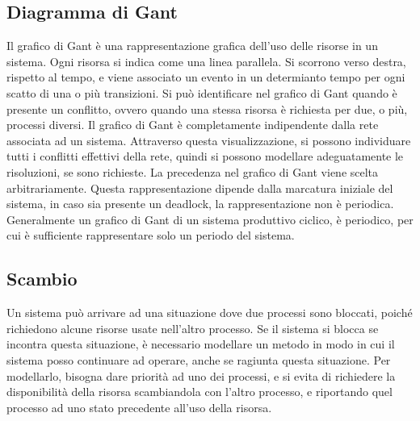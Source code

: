 \documentclass{article}
\numberwithin{equation}{subsection}
\begin{document}
\subsection{Diagramma di Gant}

Il grafico di Gant è una rappresentazione grafica dell'uso delle risorse in un sistema. Ogni risorsa si indica come una linea parallela. Si scorrono verso destra, rispetto 
al tempo, e viene associato un evento in un determianto tempo per ogni scatto di una o più transizioni. Si può identificare nel grafico di Gant quando è presente un conflitto, 
ovvero quando una stessa risorsa è richiesta per due, o più, processi diversi. Il grafico di Gant è completamente indipendente dalla rete associata ad un sistema. Attraverso 
questa visualizzazione, si possono individuare tutti i conflitti effettivi della rete, quindi si possono modellare adeguatamente le risoluzioni, se sono richieste. La 
precedenza nel grafico di Gant viene scelta arbitrariamente. Questa 
rappresentazione dipende dalla marcatura iniziale del sistema, in caso sia presente un deadlock, la rappresentazione non è periodica. Generalmente un grafico di Gant di un 
sistema produttivo ciclico, è periodico, per cui è sufficiente rappresentare solo un periodo del sistema. 

\subsection{Scambio}

Un sistema può arrivare ad una situazione dove due processi sono bloccati, poiché richiedono alcune risorse usate nell'altro processo. Se il sistema si blocca se incontra 
questa situazione, è necessario modellare un metodo in modo in cui il sistema posso continuare ad operare, anche se ragiunta questa situazione. Per modellarlo, bisogna 
dare priorità ad uno dei processi, e si evita di richiedere la disponibilità della risorsa scambiandola con l'altro processo, e riportando quel processo ad uno stato 
precedente all'uso della risorsa. 
\end{document}

